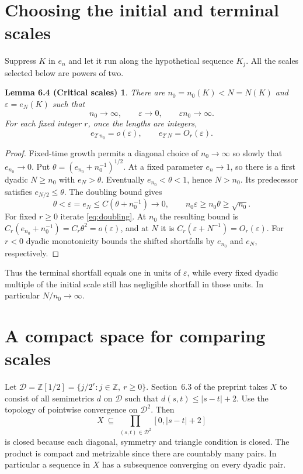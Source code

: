 \documentclass[11pt,a4paper]{article}
\newcommand{\Z}{\mathbb{Z}}
\newcommand{\D}{\mathcal{D}}
\newtheorem*{critical}{Lemma 6.4 (Critical scales)}
\begin{document}
\section{Choosing the initial and terminal scales}
Suppress $K$ in $e_n$ and let it run along the hypothetical sequence $K_j$.
All the scales selected below are powers of two.
\begin{critical}
There are $n_0=n_0(K)<N=N(K)$ and $\varepsilon=e_N(K)$ such that
\begin{equation}\label{eq:critical}
 n_0\longrightarrow\infty,\qquad \varepsilon\longrightarrow0,\qquad
 \varepsilon n_0\longrightarrow\infty .
\end{equation}
For each fixed integer $r$, once the lengths are integers,
\begin{equation}\label{eq:shifts}
 e_{2^r n_0}=o(\varepsilon),\qquad e_{2^r N}=O_r(\varepsilon).
\end{equation}
\end{critical}
\begin{proof}
Fixed-time growth permits a diagonal choice of $n_0\to\infty$ so slowly that
$e_{n_0}\to0$. Put $\theta=(e_{n_0}+n_0^{-1})^{1/2}$. At a fixed parameter
$e_n\to1$, so there is a first dyadic $N\ge n_0$ with $e_N>\theta$.
Eventually $e_{n_0}<\theta<1$, hence $N>n_0$. Its predecessor satisfies
$e_{N/2}\le\theta$. The doubling bound gives
\[
 \theta<\varepsilon=e_N\le C(\theta+n_0^{-1})\to0,\qquad
 n_0\varepsilon\ge n_0\theta\ge\sqrt{n_0}.
\]
For fixed $r\ge0$ iterate \eqref{eq:doubling}. At $n_0$ the resulting bound is
$C_r(e_{n_0}+n_0^{-1})=C_r\theta^2=o(\varepsilon)$, and at $N$ it is
$C_r(\varepsilon+N^{-1})=O_r(\varepsilon)$. For $r<0$ dyadic monotonicity
bounds the shifted shortfalls by $e_{n_0}$ and $e_N$, respectively.
\end{proof}
Thus the terminal shortfall equals one in units of $\varepsilon$, while every
fixed dyadic multiple of the initial scale still has negligible shortfall in
those units. In particular $N/n_0\to\infty$.

\section{A compact space for comparing scales}
Let $\D=\Z[1/2]=\{j/2^r:j\in\Z,\ r\ge0\}$. Section~6.3 of the preprint takes $X$
to consist of all semimetrics $d$ on $\D$ such that $d(s,t)\le |s-t|+2$.
Use the topology of pointwise convergence on $\D^2$. Then
\[
 X\ \subseteq\ \prod_{(s,t)\in\D^2}[0,|s-t|+2]
\]
is closed because each diagonal, symmetry and triangle condition is closed.
The product is compact and metrizable since there are countably many pairs.
In particular a sequence in $X$ has a subsequence converging on every dyadic pair.
\end{document}
